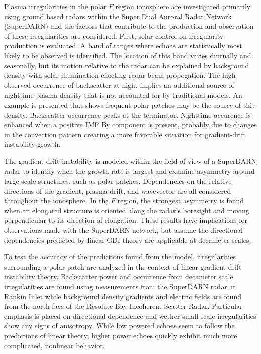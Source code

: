 
Plasma irregularities in the polar \(F\) region ionosphere are investigated primarily using ground based radars within the Super Dual Auroral Radar Network (SuperDARN) and the factors that contribute to the production and observation of these irregularities are considered.  First, solar control on irregularity production is evaluated.  A band of ranges where echoes are statistically most likely to be observed is identified.  The location of this band varies diurnally and seasonally, but its motion relative to the radar can be explained by background density with solar illumination effecting radar beam propogation.  The high observed occurrence of backscatter at night implies an additional source of nighttime plasma density that is not accounted for by traditional models.  An example is presented that shows frequent polar patches may be the source of this density.  Backscatter occurrence peaks at the terminator.  Nighttime occurence is enhanced when a positive IMF By component is present, probably due to changes in the convection pattern creating a more favorable situation for gradient-drift instability growth.

The gradient-drift instability is modeled within the field of view of a SuperDARN radar to identify when the growth rate is largest and examine asymmetry around large-scale structures, such as polar patches.  Dependencies on the relative directions of the gradient, plasma drift, and wavevector are all considered throughout the ionosphere.  In the \(F\) region, the strongest asymmetry is found when an elongated structure is oriented along the radar's boresight and moving perpendicular to its direction of elongation.  These results have implications for observations made with the SuperDARN network, but assume the directional dependencies predicted by linear GDI theory are applicable at decameter scales.

To test the accuracy of the predictions found from the model, irregularities surrounding a polar patch are analyzed in the context of linear gradient-drift instability theory.  Backscatter power and occurrence from decameter scale irregularities are found using measurements from the SuperDARN radar at Rankin Inlet while background density gradients and electric fields are found from the north face of the Resolute Bay Incoherent Scatter Radar.  Particular emphasis is placed on directional dependence and wether small-scale irregularities show any signs of anisotropy.  While low powered echoes seem to follow the predictions of linear theory, higher power echoes quickly exhibit much more complicated, nonlinear behavior.